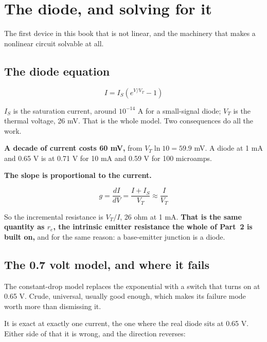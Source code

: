 
\section{The diode, and solving for it}
\label{c4:app:b}

The first device in this book that is not linear, and the machinery that makes a nonlinear circuit solvable at all.

\subsection{The diode equation}
\label{c4:sec:b1}
\[
  I = I_S \left( e^{V/V_T} - 1 \right)
\]

$I_S$ is the saturation current, around $10^{-14}$ A for a small-signal diode; $V_T$ is the thermal voltage, 26 mV. That is the whole model. Two consequences do all the work.

\textbf{A decade of current costs 60 mV,} from $V_T \ln 10 = 59.9$ mV. A diode at 1 mA and 0.65 V is at 0.71 V for 10 mA and 0.59 V for 100 microamps.

\textbf{The slope is proportional to the current.}

\[
  g = \frac{dI}{dV} = \frac{I + I_S}{V_T} \approx \frac{I}{V_T}
\]

So the incremental resistance is $V_T/I$, 26 ohm at 1 mA. \textbf{That is the same quantity as $r_e$, the intrinsic emitter resistance the whole of Part~2 is built on,} and for the same reason: a base-emitter junction is a diode.

\subsection{The 0.7 volt model, and where it fails}
\label{c4:sec:b2}
The constant-drop model replaces the exponential with a switch that turns on at 0.65 V. Crude, universal, usually good enough, which makes its failure mode worth more than dismissing it.


It is exact at exactly one current, the one where the real diode sits at 0.65 V. Either side of that it is wrong, and the direction reverses:

